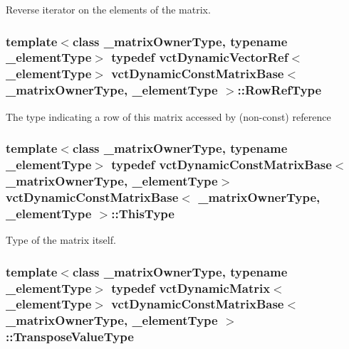 Reverse iterator on the elements of the matrix. \hypertarget{classvct_dynamic_const_matrix_base_a15b845e745a76559d730ecef10a991b7}{
\subsubsection[{Row\-Ref\-Type}]{\setlength{\rightskip}{0pt plus 5cm}template$<$class \-\_\-matrix\-Owner\-Type, typename \-\_\-element\-Type$>$ typedef {\bf vct\-Dynamic\-Vector\-Ref}$<$\-\_\-element\-Type$>$ {\bf vct\-Dynamic\-Const\-Matrix\-Base}$<$ \-\_\-matrix\-Owner\-Type, \-\_\-element\-Type $>$\-::{\bf Row\-Ref\-Type}}}\label{classvct_dynamic_const_matrix_base_a15b845e745a76559d730ecef10a991b7}
The type indicating a row of this matrix accessed by (non-\/const) reference \hypertarget{classvct_dynamic_const_matrix_base_ac4ff48cbe4d9de3fdef5a02447ffb9db}{
\subsubsection[{This\-Type}]{\setlength{\rightskip}{0pt plus 5cm}template$<$class \-\_\-matrix\-Owner\-Type, typename \-\_\-element\-Type$>$ typedef {\bf vct\-Dynamic\-Const\-Matrix\-Base}$<$\-\_\-matrix\-Owner\-Type, \-\_\-element\-Type$>$ {\bf vct\-Dynamic\-Const\-Matrix\-Base}$<$ \-\_\-matrix\-Owner\-Type, \-\_\-element\-Type $>$\-::{\bf This\-Type}}}\label{classvct_dynamic_const_matrix_base_ac4ff48cbe4d9de3fdef5a02447ffb9db}
Type of the matrix itself. \hypertarget{classvct_dynamic_const_matrix_base_aae6fde8d869581c6de1f1cbe7f17c588}{
\subsubsection[{Transpose\-Value\-Type}]{\setlength{\rightskip}{0pt plus 5cm}template$<$class \-\_\-matrix\-Owner\-Type, typename \-\_\-element\-Type$>$ typedef {\bf vct\-Dynamic\-Matrix}$<$\-\_\-element\-Type$>$ {\bf vct\-Dynamic\-Const\-Matrix\-Base}$<$ \-\_\-matrix\-Owner\-Type, \-\_\-element\-Type $>$\-::{\bf Transpose\-Value\-Type}}}\label{classvct_dynamic_const_matrix_base_aae6fde8d869581c6de1f1cbe7f17c588}
